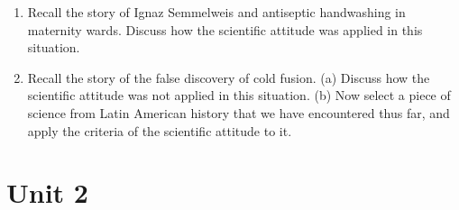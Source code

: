 \documentclass[10pt]{article}
\begin{document}
\begin{enumerate}
\item Recall the story of Ignaz Semmelweis and antiseptic handwashing in maternity wards.  Discuss how the scientific attitude was applied in this situation. \\ \vspace{1cm}
\item Recall the story of the false discovery of cold fusion.  (a) Discuss how the scientific attitude was not applied in this situation. (b) Now select a piece of science from Latin American history that we have encountered thus far, and apply the criteria of the scientific attitude to it.  \\ \vspace{1cm}
\end{enumerate}

\section{Unit 2}
\end{document}
